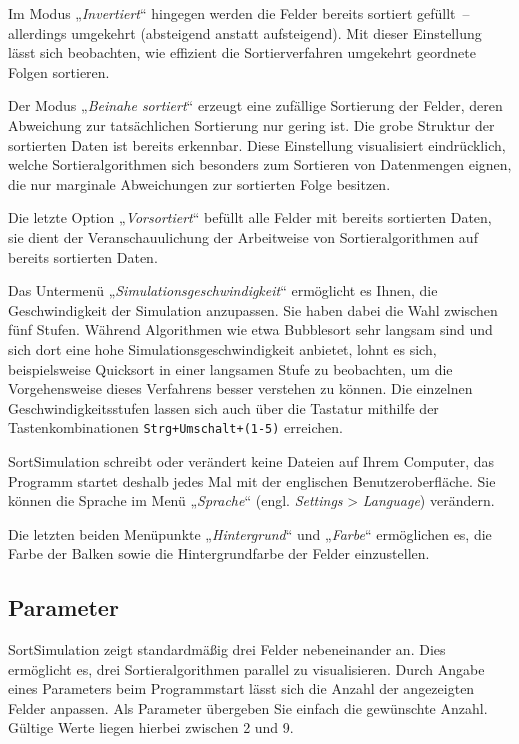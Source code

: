 \documentclass[german]{pfBook}
\begin{document}
	Im Modus „\emph{Invertiert}“ hingegen werden die Felder bereits sortiert gefüllt~-- allerdings umgekehrt (absteigend anstatt aufsteigend). Mit dieser Einstellung lässt sich beobachten, wie effizient die Sortierverfahren umgekehrt geordnete Folgen sortieren.
	
	Der Modus „\emph{Beinahe sortiert}“ erzeugt eine zufällige Sortierung der Felder, deren Abweichung zur tatsächlichen Sortierung nur gering ist. Die grobe Struktur der sortierten Daten ist bereits erkennbar. Diese Einstellung visualisiert eindrücklich, welche Sortieralgorithmen sich besonders zum Sortieren von Datenmengen eignen, die nur marginale Abweichungen zur sortierten Folge besitzen.
	
	Die letzte Option „\emph{Vorsortiert}“ befüllt alle Felder mit bereits sortierten Daten, sie dient der Veranschauulichung der Arbeitweise von Sortieralgorithmen auf bereits sortierten Daten.
	
	Das Untermenü „\emph{Simulationsgeschwindigkeit}“ ermöglicht es Ihnen, die Geschwindigkeit der Simulation anzupassen. Sie haben dabei die Wahl zwischen fünf Stufen. Während Algorithmen wie etwa Bubblesort sehr langsam sind und sich dort eine hohe Simulationsgeschwindigkeit anbietet, lohnt es sich, beispielsweise Quicksort in einer langsamen Stufe zu beobachten, um die Vorgehensweise dieses Verfahrens besser verstehen zu können. Die einzelnen Geschwindigkeitsstufen lassen sich auch über die Tastatur mithilfe der Tastenkombinationen \texttt{Strg+Umschalt+(1-5)} erreichen.
	
	SortSimulation schreibt oder verändert keine Dateien auf Ihrem Computer, das Programm startet deshalb jedes Mal mit der englischen Benutzeroberfläche. Sie können die Sprache im Menü „\emph{Sprache}“ (engl. \emph{Settings} > \emph{Language}) verändern.
	
	Die letzten beiden Menüpunkte „\emph{Hintergrund}“ und „\emph{Farbe}“ ermöglichen es, die Farbe der Balken sowie die Hintergrundfarbe der Felder einzustellen.
	
	\subsection{Parameter}
	\label{StartUpArguments}
	
	SortSimulation zeigt standardmäßig drei Felder nebeneinander an. Dies ermöglicht es, drei Sortieralgorithmen parallel zu visualisieren. Durch Angabe eines Parameters beim Programmstart lässt sich die Anzahl der angezeigten Felder anpassen. Als Parameter übergeben Sie einfach die gewünschte Anzahl. Gültige Werte liegen hierbei zwischen 2 und 9.
	
\end{document}
